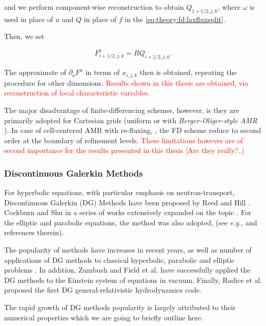 and we perform component-wise reconstruction to obtain $Q_{1+1/2,j,k}$, where $\omega$ is used in place of $u$ and $Q$ in place of $f$ in the \ref{eq:theory:fd:laxfluxsplit}. 

Then, we set

\begin{equation}
F^1_{i+1/2, j, k} = RQ_{i+1/2, j, k}.
\end{equation}

The approximate of $\partial_a F^a$ in terms of $x_{i,j,k}$ then is obtained, repeating the procedure for other dimensions.
\textcolor{red}{Results shown in this thesis are obtained, via reconstruction of local characteristic  variables.} 

The major disadvantage of finite-differencing schemes, however, is they are primarily adopted for Cartesian grids (uniform or with \textit{Berger-Oliger-style AMR} \cite{Berger:1984}). 
In case of cell-centered AMR with re-fluxing, \cite{Berger:1989}, the FD scheme reduce to second order at the boundary of refinement levels. 
\textcolor{red}{These limitations however are of second importance for the results presented in this thesis [Are they really?..]}


\subsubsection{Discontinuous Galerkin Methods}



For hyperbolic equations, with particular emphasis on neutron-transport, Discontinuous Galerkin (DG) Methods have been proposed by Reed and Hill \cite{Reed:1973}. Cockburn and Shu in a series of works extensively expanded on the topic \cite{Cockburn:1991,Cockburn:1989ii,Cockburn:1989iii,Cockburn:1990iv,Cockburn:1998v}. For the elliptic and parabolic equations, the method was also adopted, (see \textit{e.g.,} \cite{Arnold:2002} and references therein). 

The popularity of methods have increases in recent years, as well as number of applications of DG methods to classical hyperbolic, parabolic and elliptic problems \cite{Cockburn:2000,Canuto:2008,Hesthaven:2007}. In addition, Zumbush \cite{Zumbusch:2009fe} and Field et al. \cite{Field:2010} have successfully applied the DG methods to the Einstein system of equations in vacuum. 
Finally, Radice et al. \cite{Radice:2011qr} proposed the first DG general-relativistic hydrodynamics code. 

The rapid growth of DG methods popularity is largely attributed to their numerical properties which we are going to briefly outline here. 

